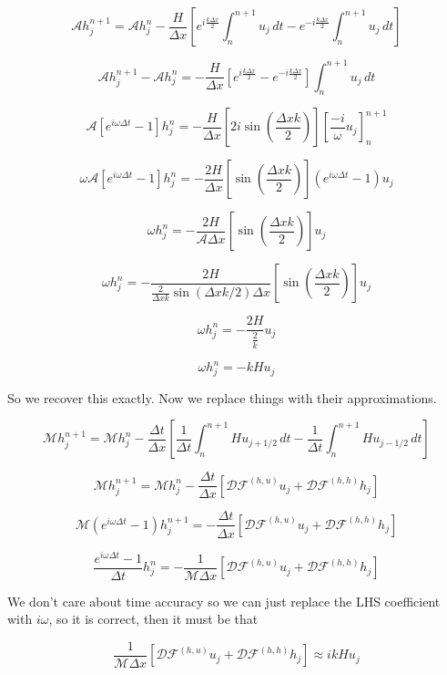 \documentclass[12pt]{article}
\begin{document}
\[\mathcal{A}h^{n+1} _j = \mathcal{A}h^n_j - \frac{H}{\Delta x}\left[ e^{i \frac{k \Delta x}{2}}\int_n^{n+1} u_{j} \, dt -  e^{-i \frac{k \Delta x}{2}}\int_n^{n+1} u_{j} \, dt \right]\]

\[\mathcal{A}h^{n+1} _j -  \mathcal{A}h^n_j  =  - \frac{H}{\Delta x}\left[ e^{i \frac{k \Delta x}{2}} -  e^{-i \frac{k \Delta x}{2}} \right]\int_n^{n+1} u_{j} \, dt\]

\[\mathcal{A}\left[e^{i \omega \Delta t} - 1\right]h^n_j  =  - \frac{H}{\Delta x}\left[ 2 i \sin\left(\frac{\Delta x k}{2}\right) \right] \left[\frac{-i}{\omega} u_j\right]_{n}^{n+1}\]

\[\omega\mathcal{A}\left[e^{i \omega \Delta t} - 1\right]h^n_j  =  - \frac{2H}{\Delta x}\left[ \sin\left(\frac{\Delta x k}{2}\right) \right] \left(e^{i \omega \Delta t} - 1\right)u_j\]

\[\omega h^n_j  =  - \frac{2H}{ \mathcal{A} \Delta x}\left[ \sin\left(\frac{\Delta x k}{2}\right) \right]u_j\]

\[\omega h^n_j  =  - \frac{2H}{ \frac{2}{\Delta x k} \sin\left(\Delta x k / 2\right) \Delta x}\left[ \sin\left(\frac{\Delta x k}{2}\right) \right]u_j\]

\[\omega h^n_j  =  - \frac{2H}{ \frac{2}{ k} }u_j\]

\[\omega h^n_j  =  - kHu_j\]

So we recover this exactly. Now we replace things with their approximations.

\[\mathcal{M}h^{n+1} _j = \mathcal{M}h^n_j - \frac{\Delta t}{\Delta x}\left[\frac{1}{\Delta t} \int_n^{n+1} Hu_{j+1/2} \, dt -  \frac{1}{\Delta t}\int_n^{n+1} Hu_{j-1/2} \, dt \right]\]

\[\mathcal{M}h^{n+1} _j = \mathcal{M}h^n_j - \frac{\Delta t}{\Delta x}\left[\mathcal{D} \mathcal{F}^{(h,u)}u_j + \mathcal{D} \mathcal{F}^{(h,h)} h_j \right]\]

\[\mathcal{M} \left(e^{i \omega \Delta t} - 1\right)h^{n+1} _j = - \frac{\Delta t}{\Delta x}\left[\mathcal{D} \mathcal{F}^{(h,u)}u_j + \mathcal{D} \mathcal{F}^{(h,h)} h_j \right]\]

\[ \frac{e^{i \omega \Delta t} - 1}{\Delta t}h^{n} _j = - \frac{1}{\mathcal{M} \Delta x}\left[\mathcal{D} \mathcal{F}^{(h,u)}u_j + \mathcal{D} \mathcal{F}^{(h,h)} h_j \right]\]

We don't care about time accuracy so we can just replace the LHS coefficient with $i\omega$, so it is correct, then it must be that

\[\frac{1}{\mathcal{M} \Delta x}\left[\mathcal{D} \mathcal{F}^{(h,u)}u_j + \mathcal{D} \mathcal{F}^{(h,h)} h_j \right] \approx ikHu_j\]
\end{document}
